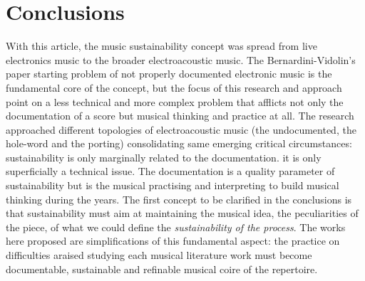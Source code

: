 \documentclass[twoside,a4paper]{article}
\begin{document}
%
%
%
%
%
%
%

\section{Conclusions}

With this article, the music sustainability concept was spread from live electronics music to the broader electroacoustic music. The Bernardini-Vidolin's paper starting problem of not properly documented electronic music is the fundamental core of the concept, but the focus of this research and approach point on a less technical and more complex problem that afflicts not only the documentation of a score but musical thinking and practice at all. The research approached different topologies of electroacoustic music (the undocumented, the hole-word and the porting) consolidating same emerging critical circumstances: sustainability is only marginally related to the documentation. it is only superficially a technical issue. The documentation is a quality parameter of sustainability but is the musical practising and interpreting to build musical thinking during the years. The first concept to be clarified in the conclusions is that sustainability must aim at maintaining the musical idea, the peculiarities of the piece, of what we could define the \emph{sustainability of the process}. The works here proposed are simplifications of this fundamental aspect: the practice on difficulties araised studying each musical literature work must become documentable, sustainable and refinable musical coire of the repertoire.
\end{document}
